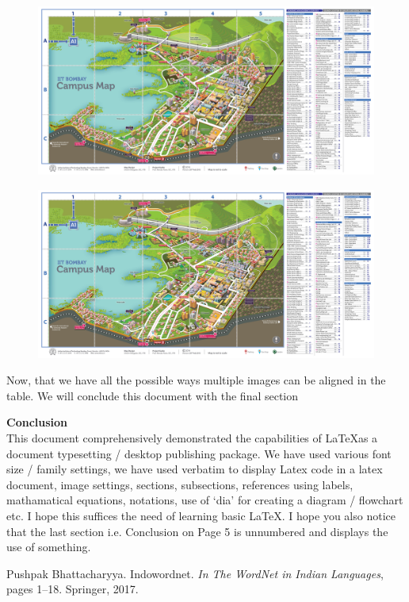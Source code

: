 \documentclass[a4paper,12pt]{extarticle}
\begin{document}
\begin{table}[ht]
\begin{subfigure}{0.41\columnwidth}
\includegraphics[width=1.3\linewidth]{img4.jpg}
    \label{fig:tablef3}
\end{subfigure}\hfill
\begin{subfigure}{0.41\columnwidth}
\includegraphics[width=1.3\linewidth]{img4.jpg} 
   \label{fig:tablef4}               
\end{subfigure}

\label{tab:mytable}
\end{table}
Now, that we have all the possible ways multiple images can be
aligned in the table. We will conclude this document with the final
section\par
\newpage
\vspace*{0.5cm}
{\noindent \Large \textbf{Conclusion}}\\

\noindent This document comprehensively demonstrated the capabilities of \LaTeX as
a document typesetting / desktop publishing package. \space We have used
various font size / family settings, we have used verbatim to display
Latex code in a latex document, image settings, sections, subsections,
references using labels, mathamatical equations, notations, use of ‘dia’
for creating a diagram / flowchart etc. \space I hope this suffices the need
of learning basic \LaTeX. I hope you also notice that the last section i.e.
Conclusion on Page 5 is unnumbered and displays the use of something.\\
  
\begin{thebibliography}{9}
Pushpak Bhattacharyya.
Indowordnet.
\textit{In The WordNet in Indian
Languages}, pages 1--18. Springer, 2017.
\end{thebibliography} 
\end{document}
